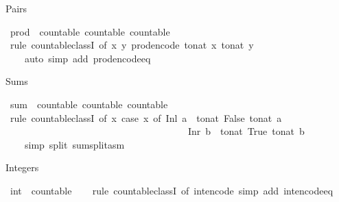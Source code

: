 \begin{isabellebody}
\begin{isamarkuptext}
Pairs%
\end{isamarkuptext}\isamarkuptrue%
\isamarkupfalse%
\ prod\ {\isacharcolon}{\isacharcolon}\ {\isacharparenleft}countable{\isacharcomma}\ countable{\isacharparenright}\ countable\isanewline
%
\isadelimproof
\ \ %
\endisadelimproof
%
\isatagproof
{}\isamarkupfalse%
\ {\isacharparenleft}rule\ countable{\isacharunderscore}classI\ {\isacharbrackleft}of\ {\isachardoublequoteopen}{\isasymlambda}{\isacharparenleft}x{\isacharcomma}\ y{\isacharparenright}{\isachardot}\ prod{\isacharunderscore}encode\ {\isacharparenleft}to{\isacharunderscore}nat\ x{\isacharcomma}\ to{\isacharunderscore}nat\ y{\isacharparenright}{\isachardoublequoteclose}{\isacharbrackright}{\isacharparenright}\isanewline
\ \ \ \ {\isacharparenleft}auto\ simp\ add{\isacharcolon}\ prod{\isacharunderscore}encode{\isacharunderscore}eq{\isacharparenright}%
\endisatagproof
{\isafoldproof}%
%
\isadelimproof
%
\endisadelimproof
%
\begin{isamarkuptext}%
Sums%
\end{isamarkuptext}\isamarkuptrue%
\isamarkupfalse%
\ sum\ {\isacharcolon}{\isacharcolon}\ {\isacharparenleft}countable{\isacharcomma}\ countable{\isacharparenright}\ countable\isanewline
%
\isadelimproof
\ \ %
\endisadelimproof
%
\isatagproof
{}\isamarkupfalse%
\ {\isacharparenleft}rule\ countable{\isacharunderscore}classI\ {\isacharbrackleft}of\ {\isachardoublequoteopen}{\isacharparenleft}{\isasymlambda}x{\isachardot}\ case\ x\ of\ Inl\ a\ {\isasymRightarrow}\ to{\isacharunderscore}nat\ {\isacharparenleft}False{\isacharcomma}\ to{\isacharunderscore}nat\ a{\isacharparenright}\isanewline
\ \ \ \ \ \ \ \ \ \ \ \ \ \ \ \ \ \ \ \ \ \ \ \ \ \ \ \ \ \ \ \ \ \ \ \ \ {\isacharbar}\ Inr\ b\ {\isasymRightarrow}\ to{\isacharunderscore}nat\ {\isacharparenleft}True{\isacharcomma}\ to{\isacharunderscore}nat\ b{\isacharparenright}{\isacharparenright}{\isachardoublequoteclose}{\isacharbrackright}{\isacharparenright}\isanewline
\ \ \ \ {\isacharparenleft}simp\ split{\isacharcolon}\ sum{\isachardot}split{\isacharunderscore}asm{\isacharparenright}%
\endisatagproof
{\isafoldproof}%
%
\isadelimproof
%
\endisadelimproof
%
\begin{isamarkuptext}%
Integers%
\end{isamarkuptext}\isamarkuptrue%
\isamarkupfalse%
\ int\ {\isacharcolon}{\isacharcolon}\ countable\isanewline
%
\isadelimproof
\ \ %
\endisadelimproof
%
\isatagproof
{}\isamarkupfalse%
\ {\isacharparenleft}rule\ countable{\isacharunderscore}classI\ {\isacharbrackleft}of\ int{\isacharunderscore}encode{\isacharbrackright}{\isacharparenright}\ {\isacharparenleft}simp\ add{\isacharcolon}\ int{\isacharunderscore}encode{\isacharunderscore}eq{\isacharparenright}%

\end{isabellebody}
